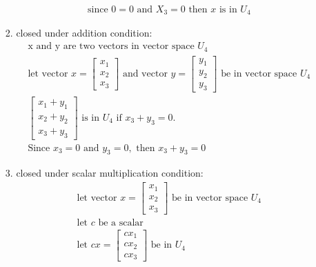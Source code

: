 \documentclass[11pt]{article}
\begin{document}
\begin{enumerate}
\begin{enumerate}
\begin{enumerate}
\[\begin{aligned}
            &\text{since } 0 = 0 \text{ and } X_3 = 0 \text{ then } x \text{ is in } U_4
        \end{aligned}
        \]
        \item closed under addition condition:
        \[
        \begin{aligned}
            &\text{x and y are two vectors in  vector space } U_4 \\
            &\text{let vector } x = \begin{bmatrix}
                x_1 \\
                x_2 \\
                x_3
            \end{bmatrix} \text{ and vector } y = \begin{bmatrix}
                y_1 \\
                y_2 \\
                y_3
            \end{bmatrix} \text{ be in vector space } U_4 \\
            &\begin{bmatrix}
                x_1 + y_1 \\
                x_2 + y_2 \\
                x_3 + y_3
            \end{bmatrix} \text{ is in } U_4  \text{ if } x_3 + y_3 = 0.\\ 
            &\text{Since } x_3 = 0 \text{ and } y_3 = 0, \text{ then } x_3 + y_3 = 0
        \end{aligned}
        \]
        \item closed under scalar multiplication condition:
        \[
        \begin{aligned}
            &\text{let vector } x = \begin{bmatrix}
                x_1 \\
                x_2 \\
                x_3
            \end{bmatrix} \text{ be in vector space } U_4 \\
            &\text{let } c \text{ be a scalar} \\
            &\text{let } cx = \begin{bmatrix}
                cx_1 \\
                cx_2 \\
                cx_3
            \end{bmatrix} \text{ be in } U_4 \\

\end{aligned}\]
\end{enumerate}
\end{enumerate}
\end{enumerate}
\end{document}

